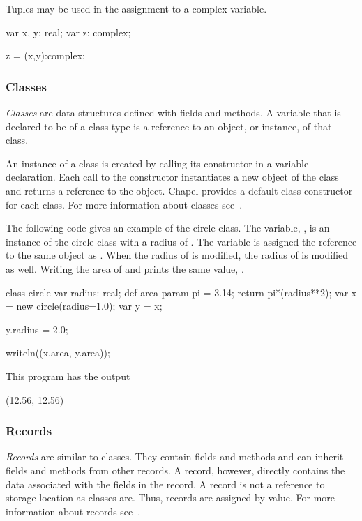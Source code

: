 \begin{example}
Tuples may be used in the assignment to a complex variable.
\begin{chapel}
var x, y: real;
var z: complex;

z = (x,y):complex;
\end{chapel}
\end{example}

\subsubsection{Classes}
\emph{Classes} are data structures defined with fields and methods.
A variable that is declared to be of a class type is a reference to an
object, or instance, of that class.
 
An instance of a class is created by calling its constructor in a
variable declaration.  Each call to the constructor instantiates a new
object of the class and returns a reference to the object.  Chapel
provides a default class constructor for each class.  For more
information about classes see~.

\begin{example}
The following code gives an example of the circle class.  The
variable, , is an instance of the circle class with a radius
of .  The variable  is assigned the reference to the
same object as .  When the radius of  is modified, the
radius of  is modified as well.  Writing the area of 
and  prints the same value, .
\begin{chapel}
class circle {
  var radius: real;
  def area {
    param pi = 3.14;
    return pi*(radius**2);
  }
}
var x = new circle(radius=1.0);
var y = x;

y.radius = 2.0;

writeln((x.area, y.area));
\end{chapel}

This program has the output
\begin{commandline}
(12.56, 12.56)
\end{commandline}
\end{example}

\subsubsection{Records}
\emph{Records} are similar to classes.  They contain fields and methods
and can inherit fields and methods from other records.  A record,
however, directly contains the data associated with the fields in the
record.  A record is not a reference to storage location as classes
are.  Thus, records are assigned by value.  For more information about
records see~.

